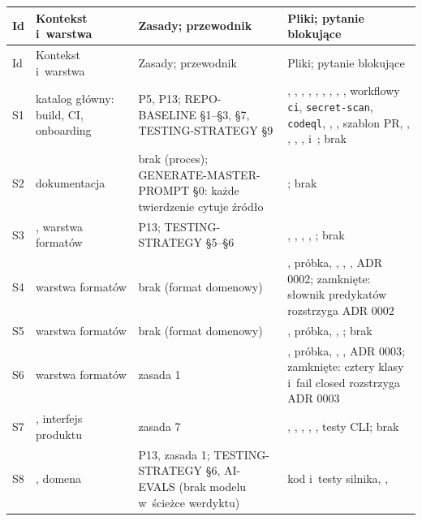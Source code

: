 {\footnotesize
\begin{xltabular}{\linewidth}{@{}l >{\raggedright\arraybackslash}p{3.1cm} >{\raggedright\arraybackslash}p{3.4cm} >{\raggedright\arraybackslash}X@{}}
\toprule
Id & Kontekst i~warstwa & Zasady; przewodnik & Pliki; pytanie blokujące \\
\midrule
\endfirsthead
\toprule
Id & Kontekst i~warstwa & Zasady; przewodnik & Pliki; pytanie blokujące \\
\midrule
\endhead
\bottomrule
\endlastfoot
S1 & katalog główny: build, CI, onboarding & P5, P13; REPO-BASELINE §1–§3, §7,
TESTING-STRATEGY §9 & , ,
, , , ,
, , ,
workflowy \texttt{ci}, \texttt{secret-scan}, \texttt{codeql}, ,
, szablon PR, , ,
, , 
i~; brak \\
S2 & dokumentacja & brak (proces); GENERATE-MASTER-PROMPT §0: każde twierdzenie cytuje
źródło & ; brak \\
S3 & , warstwa formatów & P13; TESTING-STRATEGY §5–§6 &
, , ,
, ; brak \\
S4 & warstwa formatów & brak (format domenowy) & , próbka,
, , , ADR 0002;
zamknięte: słownik predykatów rozstrzyga ADR 0002 \\
S5 & warstwa formatów & brak (format domenowy) & , próbka,
, ; brak \\
S6 & warstwa formatów & zasada 1 & , próbka,
, , ADR 0003; zamknięte: cztery klasy i~fail
closed rozstrzyga ADR 0003 \\
S7 & , interfejs produktu & zasada 7 & ,
, , , ,
testy CLI; brak \\
S8 & , domena & P13, zasada 1; TESTING-STRATEGY §6,
AI-EVALS (brak modelu w~ścieżce werdyktu) & kod i~testy silnika, ,

\end{xltabular}}
